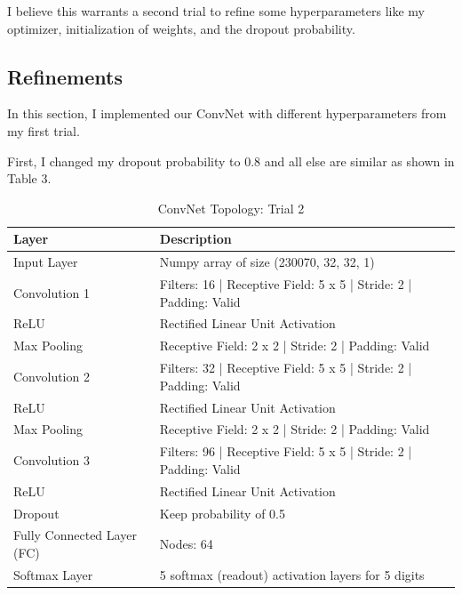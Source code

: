 \documentclass[twoside, column]{article}
\begin{document}
I believe this warrants a second trial to refine some hyperparameters like my optimizer, initialization of weights, and the dropout probability. 

 
 \subsection{Refinements}
 
In this section, I implemented our ConvNet with different hyperparameters from my first trial.
 
First, I changed my dropout probability to 0.8 and all else are similar as shown in Table 3. 

\begin{table}[htp]
\caption{ConvNet Topology: Trial 2}
\begin{center}
\begin{tabular}{llr}

\cmidrule(r){1-2}
Layer & Description \\
\midrule
Input Layer & Numpy array of size (230070, 32, 32, 1)\\
Convolution 1 & Filters: 16 | Receptive Field: 5 x 5 | Stride: 2 | Padding: Valid\\
ReLU & Rectified Linear Unit Activation\\
Max Pooling & Receptive Field: 2 x 2 | Stride: 2 | Padding: Valid\\
Convolution 2 & Filters: 32 | Receptive Field: 5 x 5 | Stride: 2 | Padding: Valid\\
ReLU & Rectified Linear Unit Activation\\
Max Pooling & Receptive Field: 2 x 2 | Stride: 2 | Padding: Valid\\
Convolution 3 & Filters: 96 | Receptive Field: 5 x 5 | Stride: 2 | Padding: Valid\\
ReLU & Rectified Linear Unit Activation\\
Dropout & Keep probability of 0.5\\
Fully Connected Layer (FC) & Nodes: 64\\
Softmax Layer & 5 softmax (readout) activation layers for 5 digits \\

\end{tabular}
\end{center}
\label{default}
\end{table}
\end{document}
